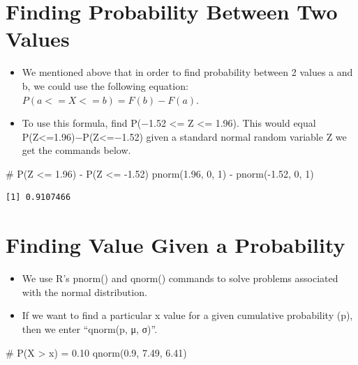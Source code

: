 \documentclass[
  letterpaper,
  DIV=11,
  numbers=noendperiod]{scrreprt}
\newenvironment{Shaded}{\begin{snugshade}}{\end{snugshade}}
\newcommand{\CommentTok}[1]{\textcolor[rgb]{0.37,0.37,0.37}{#1}}
\newcommand{\DecValTok}[1]{\textcolor[rgb]{0.68,0.00,0.00}{#1}}
\newcommand{\FloatTok}[1]{\textcolor[rgb]{0.68,0.00,0.00}{#1}}
\newcommand{\FunctionTok}[1]{\textcolor[rgb]{0.28,0.35,0.67}{#1}}
\newcommand{\NormalTok}[1]{\textcolor[rgb]{0.00,0.23,0.31}{#1}}
\newcommand{\SpecialCharTok}[1]{\textcolor[rgb]{0.37,0.37,0.37}{#1}}
\providecommand{\tightlist}{%
  \setlength{\itemsep}{0pt}\setlength{\parskip}{0pt}}\usepackage{longtable,booktabs,array}
\begin{document}
\section{Finding Probability Between Two
Values}\label{finding-probability-between-two-values}

\begin{itemize}
\tightlist
\item
  We mentioned above that in order to find probability between 2 values
  a and b, we could use the following equation:
  \(P(a<=X<=b) = F(b)- F(a)\).
\item
  To use this formula, find P(−1.52 \textless= Z \textless= 1.96). This
  would equal P(Z\textless=1.96)−P(Z\textless=−1.52) given a standard
  normal random variable Z we get the commands below.
\end{itemize}

\begin{Shaded}
\begin{Highlighting}[]
\CommentTok{\# P(Z \textless{}= 1.96) {-} P(Z \textless{}= {-}1.52)}
\FunctionTok{pnorm}\NormalTok{(}\FloatTok{1.96}\NormalTok{, }\DecValTok{0}\NormalTok{, }\DecValTok{1}\NormalTok{) }\SpecialCharTok{{-}} \FunctionTok{pnorm}\NormalTok{(}\SpecialCharTok{{-}}\FloatTok{1.52}\NormalTok{, }\DecValTok{0}\NormalTok{, }\DecValTok{1}\NormalTok{)}
\end{Highlighting}
\end{Shaded}

\begin{verbatim}
[1] 0.9107466
\end{verbatim}

\section{Finding Value Given a
Probability}\label{finding-value-given-a-probability}

\begin{itemize}
\tightlist
\item
  We use R's pnorm() and qnorm() commands to solve problems associated
  with the normal distribution.
\item
  If we want to find a particular x value for a given cumulative
  probability (p), then we enter ``qnorm(p, μ, σ)''.
\end{itemize}

\begin{Shaded}
\begin{Highlighting}[]
\CommentTok{\# P(X \textgreater{} x) = 0.10}
\FunctionTok{qnorm}\NormalTok{(}\FloatTok{0.9}\NormalTok{, }\FloatTok{7.49}\NormalTok{, }\FloatTok{6.41}\NormalTok{)}
\end{Highlighting}
\end{Shaded}
\end{document}
